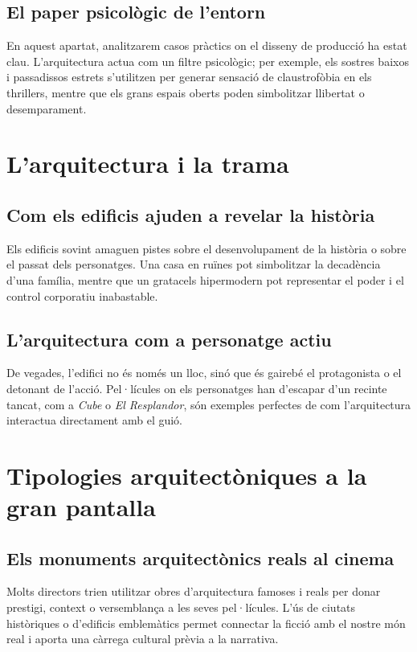 \documentclass[11pt, a4paper]{report}
\begin{document}
\section{El paper psicològic de l'entorn}
En aquest apartat, analitzarem casos pràctics on el disseny de producció ha estat clau. L'arquitectura actua com un filtre psicològic; per exemple, els sostres baixos i passadissos estrets s'utilitzen per generar sensació de claustrofòbia en els thrillers, mentre que els grans espais oberts poden simbolitzar llibertat o desemparament.

\chapter{L'arquitectura i la trama}

\section{Com els edificis ajuden a revelar la història}
Els edificis sovint amaguen pistes sobre el desenvolupament de la història o sobre el passat dels personatges. Una casa en ruïnes pot simbolitzar la decadència d'una família, mentre que un gratacels hipermodern pot representar el poder i el control corporatiu inabastable.

\section{L'arquitectura com a personatge actiu}
De vegades, l'edifici no és només un lloc, sinó que és gairebé el protagonista o el detonant de l'acció. Pel·lícules on els personatges han d'escapar d'un recinte tancat, com a \textit{Cube} o \textit{El Resplandor}, són exemples perfectes de com l'arquitectura interactua directament amb el guió.

\chapter{Tipologies arquitectòniques a la gran pantalla}

\section{Els monuments arquitectònics reals al cinema}
Molts directors trien utilitzar obres d'arquitectura famoses i reals per donar prestigi, context o versemblança a les seves pel·lícules. L'ús de ciutats històriques o d'edificis emblemàtics permet connectar la ficció amb el nostre món real i aporta una càrrega cultural prèvia a la narrativa.
\end{document}
